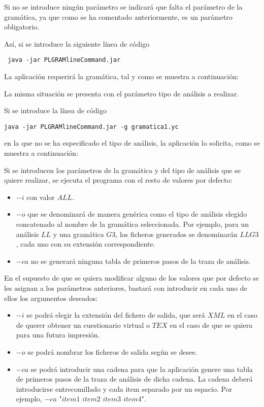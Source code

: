  
Si no se introduce ningún parámetro se indicará que falta el parámetro de la gramática, ya que como se ha comentado anteriormente, es un parámetro obligatorio.
 
Así, si se introduce la siguiente línea de código 
\begin{verbatim}
 java -jar PLGRAMlineCommand.jar  
\end{verbatim}

La aplicación requerirá la gramática, tal y como se muestra a continuación:

 
La misma situación se presenta con el parámetro tipo de análisis a realizar.
 
Si se  introduce la línea de código
\begin{verbatim}
java -jar PLGRAMlineCommand.jar -g gramatica1.yc 
\end{verbatim}
en la que no se ha especificado el tipo de análisis, la aplicación lo solicita, como se muestra a continuación:

Si se introducen los parámetros de la gramática y del tipo de análisis que se quiere realizar, se ejecuta el programa con el resto de valores por defecto:
\begin{itemize}
\item $-i$ con valor $ALL$.
\item $-o$ que se denominará de manera genérica como el tipo de análisis elegido concatenado al nombre de la gramática seleccionada. Por ejemplo, para un análisis $LL$ y una gramática $G3$, los ficheros generados se denominarán $LLG3$, cada uno con su extensión correspondiente.
\item $-ca$ no se generará ninguna tabla de primeros pasos de la traza de análisis.
\end{itemize}


En el supuesto de que se quiera modificar alguno de los valores que por defecto se les asignan a los parámetros anteriores, bastará con introducir en cada uno de ellos los argumentos deseados:
\begin{itemize}
\item $-i$ se podrá elegir la extensión del fichero de salida, que será $XML$ en el caso de querer obtener un cuestionario virtual o  $TEX$ en el caso de que se quiera para una futura impresión.
\item $-o$ se podrá nombrar los ficheros de salida según se desee.
\item $-ca$ se podrá introducir una cadena para  que la aplicación genere una tabla de primeros pasos de la traza de análisis de dicha cadena.
La cadena deberá introducirse entrecomillado y cada item separado por un espacio. Por ejemplo, $-ca$ "$item1$ $item2$ $item3$ $item4$".
\end{itemize}


